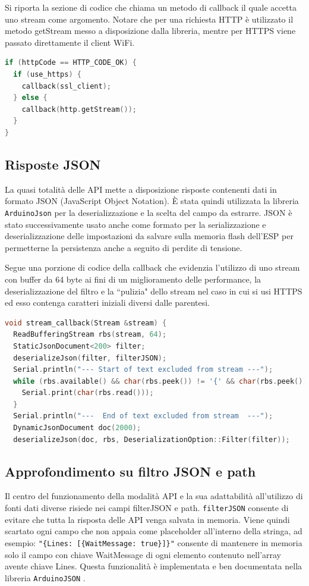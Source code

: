 \documentclass[12pt,a4paper]{report}
\begin{document}
Si riporta la sezione di codice che chiama un metodo di callback il quale accetta uno stream come argomento. Notare che per una richiesta
HTTP è utilizzato il metodo getStream messo a disposizione dalla libreria, mentre per HTTPS viene passato direttamente il client WiFi.
\begin{lstlisting}[language=cpp]
if (httpCode == HTTP_CODE_OK) {
  if (use_https) {
    callback(ssl_client);
  } else {
    callback(http.getStream());
  }
}
\end{lstlisting}

\subsection{Risposte JSON}
La quasi totalità delle API mette a disposizione risposte contenenti dati in formato JSON (JavaScript Object Notation). È stata quindi
utilizzata la libreria \texttt{ArduinoJson} per la deserializzazione e la scelta del campo da estrarre.
JSON è stato successivamente usato anche come formato per la serializzazione e deserializzazione delle impostazioni da salvare sulla
memoria flash dell'ESP per permetterne la persistenza anche a seguito di perdite di tensione.

Segue una porzione di codice della callback che evidenzia l'utilizzo di uno stream con buffer da 64 byte ai fini di un miglioramento delle
performance, la deserializzazione del filtro e la ``pulizia" dello stream nel caso in cui si usi HTTPS ed esso contenga caratteri iniziali
diversi dalle parentesi.
\begin{lstlisting}[language=cpp]
void stream_callback(Stream &stream) {
  ReadBufferingStream rbs(stream, 64);
  StaticJsonDocument<200> filter;
  deserializeJson(filter, filterJSON);
  Serial.println("--- Start of text excluded from stream ---");
  while (rbs.available() && char(rbs.peek()) != '{' && char(rbs.peek()) != '[') {
    Serial.print(char(rbs.read()));
  }
  Serial.println("---  End of text excluded from stream  ---");
  DynamicJsonDocument doc(2000);
  deserializeJson(doc, rbs, DeserializationOption::Filter(filter));
\end{lstlisting}

\subsection{Approfondimento su filtro JSON e path}
Il centro del funzionamento della modalità API e la sua adattabilità all'utilizzo di fonti dati diverse risiede nei campi
filterJSON e path.
\texttt{filterJSON} consente di evitare che tutta la risposta delle API venga salvata in memoria. Viene quindi scartato ogni campo che non
appaia come placeholder all'interno della stringa, ad esempio:
\texttt{"\{Lines: [\{WaitMessage: true\}]\}"} consente di mantenere
in memoria solo il campo con chiave WaitMessage di ogni elemento contenuto nell'array avente chiave Lines. Questa funzionalità è
implementata e ben documentata nella libreria \texttt{ArduinoJSON} \cite{arduinojsonfiltering}.
\end{document}
